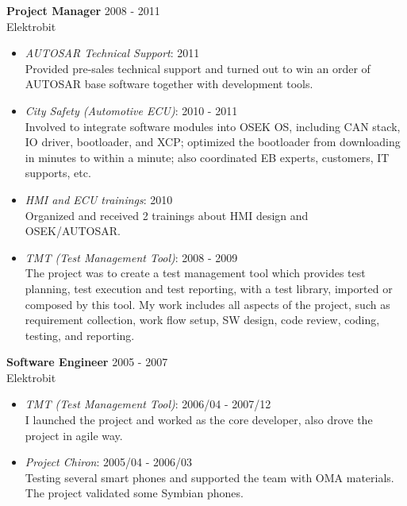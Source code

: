 \textbf{Project Manager} \hfill 2008 - 2011\\
        Elektrobit
        \begin{itemize}  \itemsep -2pt %
            \item {\em AUTOSAR Technical Support}: 2011 \\
                    Provided pre-sales technical support
                    and turned out to win an order of AUTOSAR base software together with development tools.
            \item {\em City Safety (Automotive ECU)}: 2010 - 2011 \\
                    Involved to integrate software modules into OSEK OS,
                    including CAN stack, IO driver, bootloader, and XCP;
                    optimized the bootloader from downloading in minutes to within a minute;
                    also coordinated EB experts, customers, IT supports, etc.
            \item {\em HMI and ECU trainings}: 2010\\
                Organized and received 2 trainings about HMI design and OSEK/AUTOSAR.
            \item {\em TMT (Test Management Tool)}: 2008 - 2009 \\
                    The project was to create a test management tool
                    which provides test planning, test execution and test reporting,
                    with a test library, imported or composed by this tool.
                    My work includes all aspects of the project,
                    such as requirement collection, work flow setup, SW design, code review, coding, testing, and reporting.
        \end{itemize}
 
\textbf{Software Engineer} \hfill 2005 - 2007 \\
        Elektrobit
        \begin{itemize}  \itemsep -2pt %
            \item {\em TMT (Test Management Tool)}: 2006/04 - 2007/12 \\ 
            I launched the project and worked as the core developer, also drove
            the project in agile way.
            \item {\em Project Chiron}: 2005/04 - 2006/03 \\
                Testing several smart phones and supported the team with OMA materials.
                The project validated some Symbian phones.
        \end{itemize}
 

